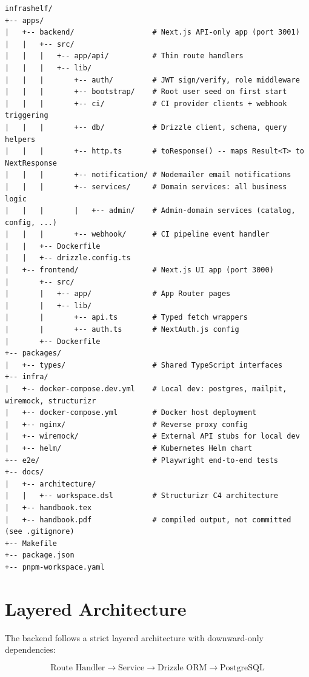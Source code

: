 \documentclass[12pt,a4paper,twoside]{report}
\begin{document}
\begin{lstlisting}
infrashelf/
+-- apps/
|   +-- backend/                  # Next.js API-only app (port 3001)
|   |   +-- src/
|   |   |   +-- app/api/          # Thin route handlers
|   |   |   +-- lib/
|   |   |       +-- auth/         # JWT sign/verify, role middleware
|   |   |       +-- bootstrap/    # Root user seed on first start
|   |   |       +-- ci/           # CI provider clients + webhook triggering
|   |   |       +-- db/           # Drizzle client, schema, query helpers
|   |   |       +-- http.ts       # toResponse() -- maps Result<T> to NextResponse
|   |   |       +-- notification/ # Nodemailer email notifications
|   |   |       +-- services/     # Domain services: all business logic
|   |   |       |   +-- admin/    # Admin-domain services (catalog, config, ...)
|   |   |       +-- webhook/      # CI pipeline event handler
|   |   +-- Dockerfile
|   |   +-- drizzle.config.ts
|   +-- frontend/                 # Next.js UI app (port 3000)
|       +-- src/
|       |   +-- app/              # App Router pages
|       |   +-- lib/
|       |       +-- api.ts        # Typed fetch wrappers
|       |       +-- auth.ts       # NextAuth.js config
|       +-- Dockerfile
+-- packages/
|   +-- types/                    # Shared TypeScript interfaces
+-- infra/
|   +-- docker-compose.dev.yml    # Local dev: postgres, mailpit, wiremock, structurizr
|   +-- docker-compose.yml        # Docker host deployment
|   +-- nginx/                    # Reverse proxy config
|   +-- wiremock/                 # External API stubs for local dev
|   +-- helm/                     # Kubernetes Helm chart
+-- e2e/                          # Playwright end-to-end tests
+-- docs/
|   +-- architecture/
|   |   +-- workspace.dsl         # Structurizr C4 architecture
|   +-- handbook.tex
|   +-- handbook.pdf              # compiled output, not committed (see .gitignore)
+-- Makefile
+-- package.json
+-- pnpm-workspace.yaml
\end{lstlisting}

\section{Layered Architecture}

The backend follows a strict layered architecture with downward-only
dependencies:

\[
\text{Route Handler} \rightarrow \text{Service} \rightarrow \text{Drizzle ORM} \rightarrow \text{PostgreSQL}
\]
\end{document}
